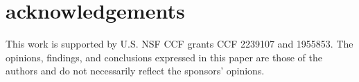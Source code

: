 
\section*{acknowledgements}

This work is supported by U.S. NSF CCF grants CCF 2239107 and 1955853. The opinions, findings, and conclusions expressed in this paper are those of the authors and do not necessarily reflect the sponsors' opinions.
